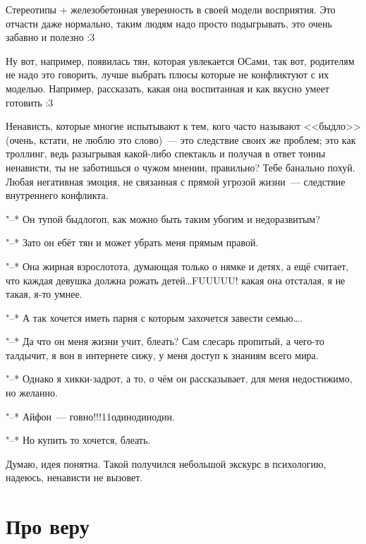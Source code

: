 \documentclass[a5paper,12pt,twoside]{memoir}
\begin{document}
Стереотипы + железобетонная уверенность в своей модели восприятия. Это отчасти даже нормально, таким людям надо просто подыгрывать, это очень забавно и полезно :3 

Ну вот, например, появилась тян, которая увлекается ОСами, так вот, родителям не надо это говорить, лучше выбрать плюсы которые не конфликтуют с их моделью. Например, рассказать, какая она воспитанная и как вкусно умеет готовить :3 

Ненависть, которые многие испытывают к тем, кого часто называют <<быдло>> (очень, кстати, не люблю это слово)~--- это следствие своих же проблем; это как троллинг, ведь разыгрывая какой-либо спектакль и получая в ответ тонны ненависти, ты не заботишься о чужом мнении, правильно? Тебе банально похуй. Любая негативная эмоция, не связанная с прямой угрозой жизни~--- следствие внутреннего конфликта. 

\medskip

"--* Он тупой быдлогоп, как можно быть таким убогим и недоразвитым? 

"--* Зато он ебёт тян и может убрать меня прямым правой.

\medskip

"--* Она жирная взрослотота, думающая только о нямке и детях, а ещё считает, что каждая девушка должна рожать детей\ldots FUUUUU! какая она отсталая, я не такая, я-то умнее.

"--* А так хочется иметь парня с которым захочется завести семью\ldots. %

\medskip

"--* Да что он меня жизни учит, блеать? Сам слесарь пропитый, а чего-то талдычит, я вон в интернете сижу, у меня доступ к знаниям всего мира.

"--* Однако я хикки-задрот, а то, о чём он рассказывает, для меня недостижимо, но желанно.

\medskip

"--* Айфон~--- говно!!!11одинодинодин. 

"--* Но купить то хочется, блеать. 

\medskip

Думаю, идея понятна. Такой получился небольшой экскурс в психологию, надеюсь, ненависти не вызовет. %




\section{Про веру} 
\end{document}

